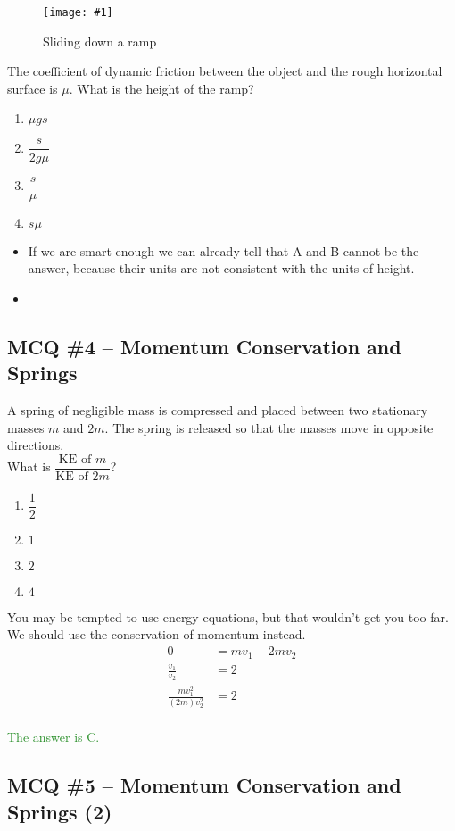 \documentclass[a4paper,12pt]{article}
\newcommand{\lb}{\\[8pt]}
\newcommand{\img}[4]{\begin{center}
  \begin{figure}[H]
    \centering
    \texttt{[image: \#1]}
    \caption{#3}
    \label{fig:#4}
  \end{figure}
\end{center}}
\newcommand{\ans}[1]{\textcolor{ForestGreen}{The answer is #1.}}
\begin{document}
\img{ex/9.png}{0.7}{Sliding down a ramp}{ramp}

The coefficient of dynamic friction between the object and the rough horizontal surface is $\mu$.
What is the height of the ramp?

\begin{enumerate}[label=\Alph*.]
  \item $\mu g s$
  \item $\dfrac{s}{2g\mu}$
  \item $\dfrac{s}{\mu}$
  \item $s\mu$
\end{enumerate}

\begin{itemize}
  \item If we are smart enough we can already tell that A and B cannot be the answer, because their units are not consistent with the units of height.
  \item
\end{itemize}

\subsection{MCQ \#4 -- Momentum Conservation and Springs}
A spring of negligible mass is compressed and placed between two stationary
masses $m$ and $2m$. The spring is released so that
the masses move in opposite directions.\lb
What is $\dfrac{\text{KE of $m$}}{\text{KE of $2m$}}$?
\begin{enumerate}[label=\Alph*.]
  \item $\dfrac{1}{2}$
  \item $1$
  \item $2$
  \item $4$
\end{enumerate}

You may be tempted to use energy equations, but that wouldn't get you too far. We should use the conservation of momentum instead.
\begin{align*}
  0                        & = m v_1 - 2m v_2 \\
  \frac{v_1}{v_2}          & = 2              \\
  \frac{mv_1^2}{(2m)v_2^2} & = 2              \\
\end{align*}

\ans{C}

\subsection{MCQ \#5 -- Momentum Conservation and Springs (2)}
\end{document}
